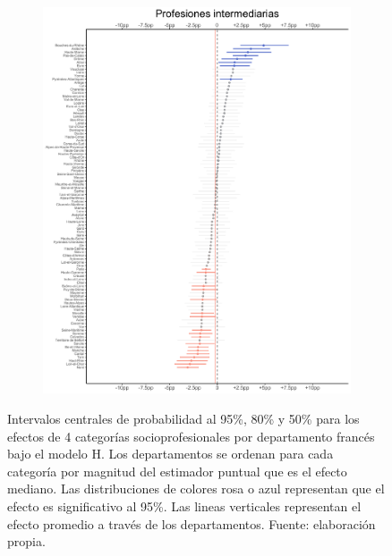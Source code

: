 \begin{figure}
\begin{subfigure}{0.45\textwidth}
	\end{subfigure}
	~
	\begin{subfigure}{0.45\textwidth}
	\includegraphics[width = \textwidth]{Figs/Efectos/Efectos_CSP4_Modelo_H}
	\end{subfigure}
	\caption{Intervalos centrales de probabilidad al 95\%, 80\% y 50\% para los efectos de 4 categorías socioprofesionales por departamento francés bajo el modelo H. Los departamentos se ordenan para cada categoría por magnitud del estimador puntual que es el efecto mediano. Las distribuciones de colores rosa o azul representan que el efecto es significativo al 95\%. Las lineas verticales representan el efecto promedio a través de los departamentos. Fuente: elaboración propia.}
	\label{fig:Efectos_Cat_Socioprof_1}
\end{figure}

